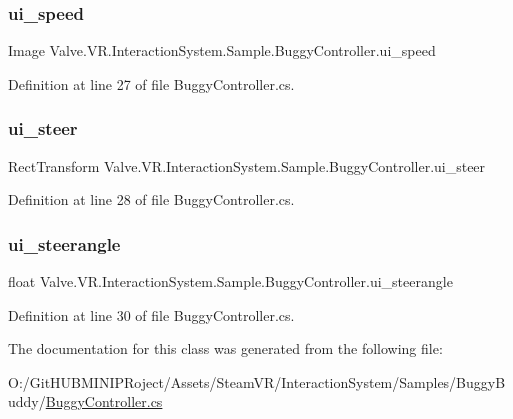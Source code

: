 \subsubsection{\texorpdfstring{ui\_speed}{ui\_speed}}
{\footnotesize\ttfamily Image Valve.\+V\+R.\+Interaction\+System.\+Sample.\+Buggy\+Controller.\+ui\+\_\+speed}



Definition at line 27 of file Buggy\+Controller.\+cs.

\mbox{\label{class_valve_1_1_v_r_1_1_interaction_system_1_1_sample_1_1_buggy_controller_af06d437a6e1c108b0bd4663e2d45e502}} 
\subsubsection{\texorpdfstring{ui\_steer}{ui\_steer}}
{\footnotesize\ttfamily Rect\+Transform Valve.\+V\+R.\+Interaction\+System.\+Sample.\+Buggy\+Controller.\+ui\+\_\+steer}



Definition at line 28 of file Buggy\+Controller.\+cs.

\mbox{\label{class_valve_1_1_v_r_1_1_interaction_system_1_1_sample_1_1_buggy_controller_a22b2114d1694109100336d54904d69bd}} 
\subsubsection{\texorpdfstring{ui\_steerangle}{ui\_steerangle}}
{\footnotesize\ttfamily float Valve.\+V\+R.\+Interaction\+System.\+Sample.\+Buggy\+Controller.\+ui\+\_\+steerangle}



Definition at line 30 of file Buggy\+Controller.\+cs.



The documentation for this class was generated from the following file\+:\begin{DoxyCompactItemize}
\item 
O\+:/\+Git\+H\+U\+B\+M\+I\+N\+I\+P\+Roject/\+Assets/\+Steam\+V\+R/\+Interaction\+System/\+Samples/\+Buggy\+Buddy/\mbox{\hyperlink{_buggy_controller_8cs}{Buggy\+Controller.\+cs}}\end{DoxyCompactItemize}
